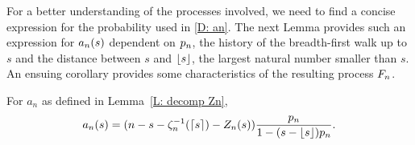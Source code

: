 For a better understanding of the processes involved, we need to find a concise expression for the probability used in \eqref{D: an}.
The next Lemma provides such an expression for $a_n(s)$ 
dependent on $p_n$, the history of the breadth-first walk up to $s$ and the distance between $s$ and $\lfloor s\rfloor$, 
the largest natural number smaller than $s$.
An ensuing corollary provides some characteristics of the resulting process $F_n$.

\begin{lemma} \label{L: formula an}
	For $a_n$ as defined in Lemma~\ref{L: decomp Zn},
	\begin{equation}
	a_n(s) = (n - s - \zeta^{-1}_n(\lceil s\rceil) - Z_n(s)) \frac{p_n}{1-(s-\lfloor s\rfloor)p_n} .
	\end{equation}
\end{lemma}

